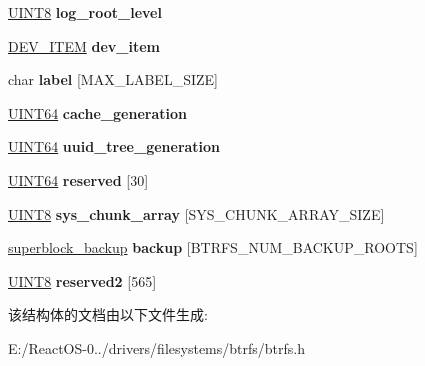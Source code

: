 \begin{DoxyCompactItemize}
\item 
\mbox{\label{structsuperblock_aaa56dbfc66120ad7fb4833b2348c1ef9}} 
\hyperlink{_processor_bind_8h_ab27e9918b538ce9d8ca692479b375b6a}{U\+I\+N\+T8} {\bfseries log\+\_\+root\+\_\+level}
\item 
\mbox{\label{structsuperblock_ae99deb2244616d9146f1aaca8e6bb629}} 
\hyperlink{struct_d_e_v___i_t_e_m}{D\+E\+V\+\_\+\+I\+T\+EM} {\bfseries dev\+\_\+item}
\item 
\mbox{\label{structsuperblock_ad01d032d5fa5064dca7cafbdbc72dc54}} 
char {\bfseries label} \mbox{[}M\+A\+X\+\_\+\+L\+A\+B\+E\+L\+\_\+\+S\+I\+ZE\mbox{]}
\item 
\mbox{\label{structsuperblock_a27566eb7153542e9ef771ed8b08b766f}} 
\hyperlink{_processor_bind_8h_a57be03562867144161c1bfee95ca8f7c}{U\+I\+N\+T64} {\bfseries cache\+\_\+generation}
\item 
\mbox{\label{structsuperblock_a3ac269f2058c1032037f84a70d575037}} 
\hyperlink{_processor_bind_8h_a57be03562867144161c1bfee95ca8f7c}{U\+I\+N\+T64} {\bfseries uuid\+\_\+tree\+\_\+generation}
\item 
\mbox{\label{structsuperblock_adaf3c3e92fa61a854e8a008e57eb1283}} 
\hyperlink{_processor_bind_8h_a57be03562867144161c1bfee95ca8f7c}{U\+I\+N\+T64} {\bfseries reserved} \mbox{[}30\mbox{]}
\item 
\mbox{\label{structsuperblock_a3165889e3faac9ec89ad6889ac73cc5b}} 
\hyperlink{_processor_bind_8h_ab27e9918b538ce9d8ca692479b375b6a}{U\+I\+N\+T8} {\bfseries sys\+\_\+chunk\+\_\+array} \mbox{[}S\+Y\+S\+\_\+\+C\+H\+U\+N\+K\+\_\+\+A\+R\+R\+A\+Y\+\_\+\+S\+I\+ZE\mbox{]}
\item 
\mbox{\label{structsuperblock_a1d38cc06a2a9f35324f99cec8e918bf0}} 
\hyperlink{structsuperblock__backup}{superblock\+\_\+backup} {\bfseries backup} \mbox{[}B\+T\+R\+F\+S\+\_\+\+N\+U\+M\+\_\+\+B\+A\+C\+K\+U\+P\+\_\+\+R\+O\+O\+TS\mbox{]}
\item 
\mbox{\label{structsuperblock_a47756f020d67e68525b05d91d73547a2}} 
\hyperlink{_processor_bind_8h_ab27e9918b538ce9d8ca692479b375b6a}{U\+I\+N\+T8} {\bfseries reserved2} \mbox{[}565\mbox{]}
\end{DoxyCompactItemize}


该结构体的文档由以下文件生成\+:\begin{DoxyCompactItemize}
\item 
E\+:/\+React\+O\+S-\/0../drivers/filesystems/btrfs/btrfs.\+h\end{DoxyCompactItemize}
